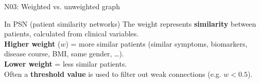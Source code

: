 \documentclass[aspectratio=169, 10pt]{beamer}
\begin{document}
\begin{frame}{N03: Weighted vs. unweighted graph}
    \vspace{3mm}
    
    \begin{block}{In PSN (patient similarity networks)}
        \footnotesize
        The weight represents \textbf{similarity} between patients, calculated from clinical variables.\\[2pt]
        \textbf{Higher weight} ($w$) = more similar patients (similar symptoms, biomarkers, disease course, BMI, same gender, \ldots).\\
        \textbf{Lower weight} = less similar patients.\\
        Often a \textbf{threshold value} is used to filter out weak connections (e.g. $w < 0.5$).
    \end{block}
    
\end{frame}
\end{document}

